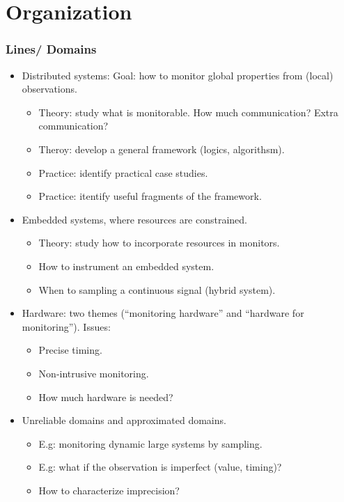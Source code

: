 \documentclass{beamer}
\begin{document}
\section{Organization}

\begin{frame}
  \frametitle{Lines/ Domains}

  \begin{itemize}
  \item \alert{Distributed systems}: 
    Goal: how to monitor global properties from (local) observations. 
    \begin{itemize} 
    \item Theory: study what is monitorable. How much communication?
      Extra communication?
    \item Theroy: develop a general framework (logics, algorithsm).
    \item Practice: identify practical case studies.
    \item Practice: itentify useful fragments of the framework.
    \end{itemize}
  \item \alert{Embedded systems}, where resources are constrained.
    \begin{itemize} 
    \item Theory: study how to incorporate resources in monitors.
    \item How to instrument an embedded system.
    \item When to sampling a continuous signal (hybrid system).
    \end{itemize}
  \item \alert{Hardware}: two themes (``monitoring hardware'' and ``hardware
    for monitoring''). Issues:
    \begin{itemize}
    \item Precise timing.
    \item Non-intrusive monitoring.
    \item How much hardware is needed?
    \end{itemize}
  \item \alert{Unreliable} domains and \alert{approximated} domains.
    \begin{itemize}
      \item E.g: monitoring dynamic large systems by sampling.
      \item E.g: what if the observation is imperfect (value, timing)?
      \item How to characterize imprecision?
    \end{itemize}
  \end{itemize}
\end{frame}
\end{document}
